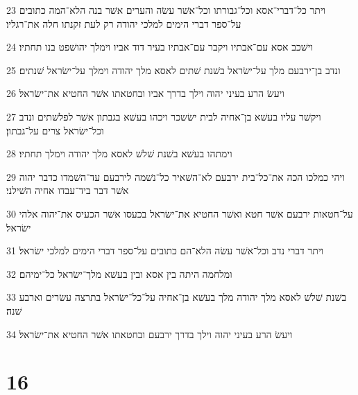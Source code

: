 \par 23 ויתר כל־דברי־אסא וכל־גבורתו וכל־אשׁר עשׂה והערים אשׁר בנה הלא־המה כתובים על־ספר דברי הימים למלכי יהודה רק לעת זקנתו חלה את־רגליו׃
\par 24 וישׁכב אסא עם־אבתיו ויקבר עם־אבתיו בעיר דוד אביו וימלך יהושׁפט בנו תחתיו׃
\par 25 ונדב בן־ירבעם מלך על־ישׂראל בשׁנת שׁתים לאסא מלך יהודה וימלך על־ישׂראל שׁנתים׃
\par 26 ויעשׂ הרע בעיני יהוה וילך בדרך אביו ובחטאתו אשׁר החטיא את־ישׂראל׃
\par 27 ויקשׁר עליו בעשׁא בן־אחיה לבית ישׂשכר ויכהו בעשׁא בגבתון אשׁר לפלשׁתים ונדב וכל־ישׂראל צרים על־גבתון׃
\par 28 וימתהו בעשׁא בשׁנת שׁלשׁ לאסא מלך יהודה וימלך תחתיו׃
\par 29 ויהי כמלכו הכה את־כל־בית ירבעם לא־השׁאיר כל־נשׁמה לירבעם עד־השׁמדו כדבר יהוה אשׁר דבר ביד־עבדו אחיה השׁילני׃
\par 30 על־חטאות ירבעם אשׁר חטא ואשׁר החטיא את־ישׂראל בכעסו אשׁר הכעיס את־יהוה אלהי ישׂראל׃
\par 31 ויתר דברי נדב וכל־אשׁר עשׂה הלא־הם כתובים על־ספר דברי הימים למלכי ישׂראל׃
\par 32 ומלחמה היתה בין אסא ובין בעשׁא מלך־ישׂראל כל־ימיהם׃
\par 33 בשׁנת שׁלשׁ לאסא מלך יהודה מלך בעשׁא בן־אחיה על־כל־ישׂראל בתרצה עשׂרים וארבע שׁנה׃
\par 34 ויעשׂ הרע בעיני יהוה וילך בדרך ירבעם ובחטאתו אשׁר החטיא את־ישׂראל׃

\chapter{16}

